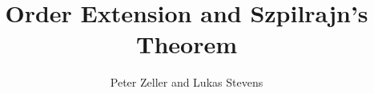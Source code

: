 \documentclass[11pt,a4paper]{article}
\begin{document}
\title{Order Extension and Szpilrajn's Theorem}
\author{Peter Zeller and Lukas Stevens}
\maketitle






\end{document}
